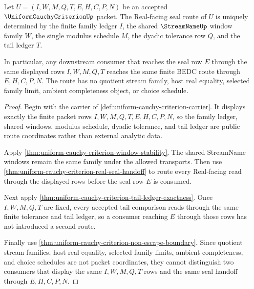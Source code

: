 \begin{theorem}
\label{thm:uniform-cauchy-criterion-finite-family-real-seal-route-determinacy}
Let $U=(I,W,M,Q,T,E,H,C,P,N)$ be an accepted
$\UniformCauchyCriterionUp$ packet. The Real-facing seal route of $U$ is
uniquely determined by the finite family ledger $I$, the shared
$\StreamNameUp$ window family $W$, the single modulus schedule $M$, the
dyadic tolerance row $Q$, and the tail ledger $T$.

In particular, any downstream consumer that reaches the seal row $E$ through
the same displayed rows $I,W,M,Q,T$ reaches the same finite BEDC route through
$E,H,C,P,N$. The route has no quotient stream family, host real equality,
selected family limit, ambient completeness object, or choice schedule.
\end{theorem}
\begin{proof}
Begin with the carrier of
\autoref{def:uniform-cauchy-criterion-carrier}. It displays exactly the finite
packet rows $I,W,M,Q,T,E,H,C,P,N$, so the family ledger, shared windows,
modulus schedule, dyadic tolerance, and tail ledger are public route
coordinates rather than external analytic data.

Apply
\autoref{thm:uniform-cauchy-criterion-window-stability}. The shared
StreamName windows remain the same family under the allowed transports. Then
use \autoref{thm:uniform-cauchy-criterion-real-seal-handoff} to route every
Real-facing read through the displayed rows before the seal row $E$ is
consumed.

Next apply
\autoref{thm:uniform-cauchy-criterion-tail-ledger-exactness}. Once
$I,W,M,Q,T$ are fixed, every accepted tail comparison reads through the same
finite tolerance and tail ledger, so a consumer reaching $E$ through those
rows has not introduced a second route.

Finally use
\autoref{thm:uniform-cauchy-criterion-non-escape-boundary}. Since quotient
stream families, host real equality, selected family limits, ambient
completeness, and choice schedules are not packet coordinates, they cannot
distinguish two consumers that display the same $I,W,M,Q,T$ rows and the same
seal handoff through $E,H,C,P,N$.
\end{proof}


